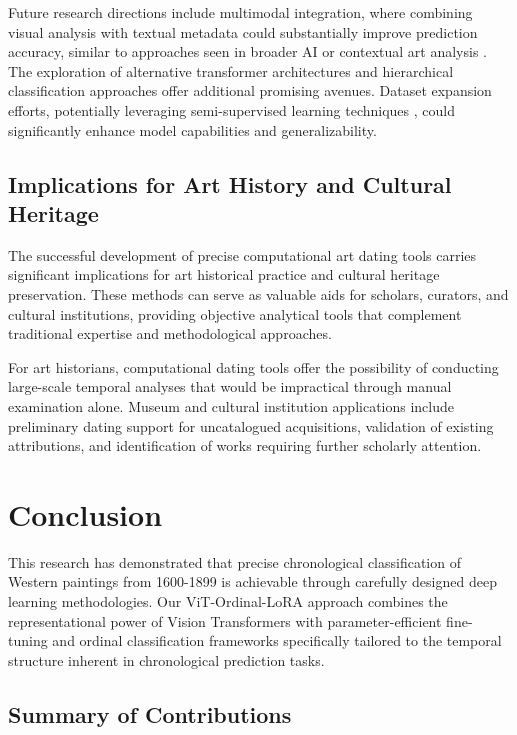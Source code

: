 \documentclass[10pt,twocolumn,letterpaper]{article}
\begin{document}
Future research directions include multimodal integration, where combining visual analysis with textual metadata could substantially improve prediction accuracy, similar to approaches seen in broader AI \cite{Alayrac22, GeminiTeam23} or contextual art analysis \cite{Garcia20ContextNet}. The exploration of alternative transformer architectures and hierarchical classification approaches offer additional promising avenues. Dataset expansion efforts, potentially leveraging semi-supervised learning techniques \cite{Yalniz19SSL}, could significantly enhance model capabilities and generalizability.

\subsection{Implications for Art History and Cultural Heritage}

The successful development of precise computational art dating tools carries significant implications for art historical practice and cultural heritage preservation. These methods can serve as valuable aids for scholars, curators, and cultural institutions, providing objective analytical tools that complement traditional expertise and methodological approaches.

For art historians, computational dating tools offer the possibility of conducting large-scale temporal analyses that would be impractical through manual examination alone. Museum and cultural institution applications include preliminary dating support for uncatalogued acquisitions, validation of existing attributions, and identification of works requiring further scholarly attention.

\section{Conclusion}

This research has demonstrated that precise chronological classification of Western paintings from 1600-1899 is achievable through carefully designed deep learning methodologies. Our ViT-Ordinal-LoRA approach combines the representational power of Vision Transformers \cite{Dosovitskiy20ViT} with parameter-efficient fine-tuning \cite{Hu21LoRA} and ordinal classification frameworks \cite{Cao20Ordinal} specifically tailored to the temporal structure inherent in chronological prediction tasks.

\subsection{Summary of Contributions}
\end{document}
